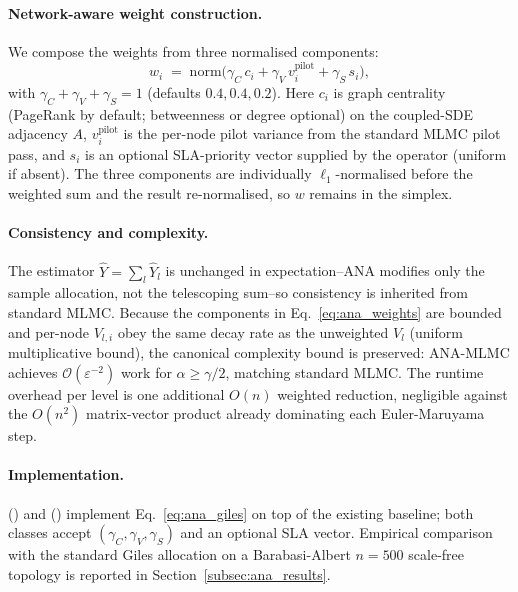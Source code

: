 \documentclass{ieeeaccess}
\begin{document}
\paragraph{Network-aware weight construction.}
We compose the weights from three normalised components:
\begin{equation}
    w_i \;=\; \mathrm{norm}\bigl(\gamma_C\, c_i
                + \gamma_V\, v_i^{\text{pilot}}
                + \gamma_S\, s_i\bigr),
    \label{eq:ana_weights}
\end{equation}
with $\gamma_C+\gamma_V+\gamma_S=1$ (defaults $0.4, 0.4, 0.2$). Here $c_i$ is graph centrality
(PageRank by default; betweenness or degree optional) on the coupled-SDE adjacency $A$,
$v_i^{\text{pilot}}$ is the per-node pilot variance from the standard MLMC pilot pass, and $s_i$
is an optional SLA-priority vector supplied by the operator (uniform if absent). The three
components are individually $\ell_1$-normalised before the weighted sum and the result
re-normalised, so $w$ remains in the simplex.

\paragraph{Consistency and complexity.}
The estimator $\hat Y = \sum_l \hat Y_l$ is unchanged in expectation--ANA modifies only the
sample allocation, not the telescoping sum--so consistency is inherited from standard MLMC.
Because the components in Eq.~\eqref{eq:ana_weights} are bounded and per-node $V_{l,i}$ obey the
same decay rate as the unweighted $V_l$ (uniform multiplicative bound), the canonical complexity
bound is preserved: ANA-MLMC achieves $\mathcal{O}(\varepsilon^{-2})$ work for
$\alpha \ge \gamma/2$, matching standard MLMC. The runtime overhead per level is one additional
$O(n)$ weighted reduction, negligible against the $O(n^2)$ matrix-vector product already
dominating each Euler-Maruyama step.

\paragraph{Implementation.}
 () and
 () implement
Eq.~\eqref{eq:ana_giles} on top of the existing baseline; both classes accept
$(\gamma_C,\gamma_V,\gamma_S)$ and an optional SLA vector. Empirical comparison with the
standard Giles allocation on a Barabasi-Albert $n=500$ scale-free topology is reported in
Section~\ref{subsec:ana_results}.
\end{document}
